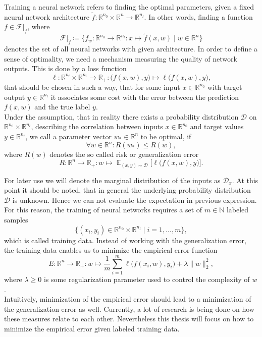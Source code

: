 \documentclass[11pt, a4paper]{article}
\newcommand{\N}{\mathbb{N}}
\newcommand{\R}{\mathbb{R}}
\newcommand{\D}{\mathcal{D}}
\newcommand{\F}{\mathcal{F}}
\DeclareMathOperator*{\E}{\mathbb{E}}
\begin{document}
Training a neural network refers to finding the optimal parameters, given a fixed neural network architecture $\tilde{f} : \R^{n_0} \times \R^n \to \R^{n_l}$. In other words, finding a function $f \in \F|_{\tilde{f}}$, where
\[ \F|_{\tilde{f}} \coloneq \Big \{ f_w : \R^{n_0} \to \R^{n_l} : x \mapsto \tilde{f}(x,w) \mid w \in \R^n \Big \} \]
denotes the set of all neural networks with given architecture. In order to define a sense of optimality, we need a mechanism measuring the quality of network outputs. This is done by a loss function
\[ \ell: \R^{n_l} \times \R^{n_l} \to \R_+ : \big ( f(x,w),y \big ) \mapsto \ell \big ( f(x,w),y \big ) ,\]
that should be chosen in such a way, that for some input $x \in \R^{n_0}$ with target output $y \in \R^{n_l}$ it associates some cost with the error between the prediction $f(x,w)$ and the true label $y$. \\

Under the assumption, that in reality there exists a probability distribution $\D$ on $\R^{n_0} \times \R^{n_l}$, describing the correlation between inputs $x \in \R^{n_0}$ and target values $y \in \R^{n_l}$, we call a parameter vector $w_* \in \R^n$ to be optimal, if
\[ \forall w \in \R^n : R(w_*) \leq R(w), \]
where $R(w)$ denotes the so called risk or generalization error 
\[ R : \R^n \to \R_+ : w \mapsto \E_{(x,y) \sim \D } \Big [ \ell \big (f(x,w),y \big ) \Big ]. \]

For later use we will denote the marginal distribution of the inputs as $\D_x$. At this point it should be noted, that in general the underlying probability distribution $\D$ is unknown. Hence we can not evaluate the expectation in previous expression. \\

For this reason, the training of neural networks requires a set of $m \in \N$ labeled samples
\[ \Big \{ (x_i,y_i) \in \R^{n_0} \times \R^{n_l} \mid i=1, \dots, m \Big \}, \]
which is called training data. Instead of working with the generalization error, the training data enables us to minimize the empirical error function
 \[ E : \R^n \to \R_+ : w \mapsto \frac{1}{m} \sum_{i=1}^{m} \ell \big ( f(x_i,w),y_i \big) + \lambda \big \| w \big \|_2^2, \]
where $\lambda \geq 0$ is some regularization parameter used to control the complexity of $w$. \\
 
Intuitively, minimization of the empirical error should lead to a minimization of the generalization error as well. Currently, a lot of research is being done on how these measures relate to each other. Nevertheless this thesis will focus on how to minimize the empirical error given labeled training data. \\
\end{document}
